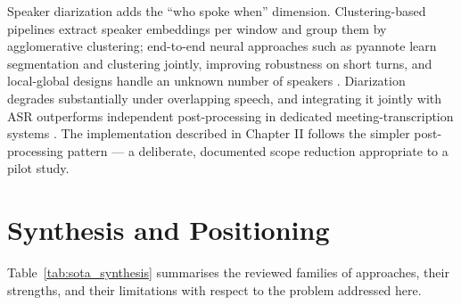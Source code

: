 \documentclass[12pt]{report}
\begin{document}
Speaker diarization adds the \enquote{who spoke when} dimension. Clustering-based pipelines extract speaker embeddings per window and group them by agglomerative clustering; end-to-end neural approaches such as pyannote \cite{bredin2020pyannote} learn segmentation and clustering jointly, improving robustness on short turns, and local-global designs handle an unknown number of speakers \cite{maiti2021endtoend}. Diarization degrades substantially under overlapping speech, and integrating it jointly with ASR outperforms independent post-processing in dedicated meeting-transcription systems \cite{raj2021integration,yoshioka2019advances,wang2021exploring}. The implementation described in Chapter II follows the simpler post-processing pattern --- a deliberate, documented scope reduction appropriate to a pilot study.

\section{Synthesis and Positioning}

Table~\ref{tab:sota_synthesis} summarises the reviewed families of approaches, their strengths, and their limitations with respect to the problem addressed here.
\end{document}
